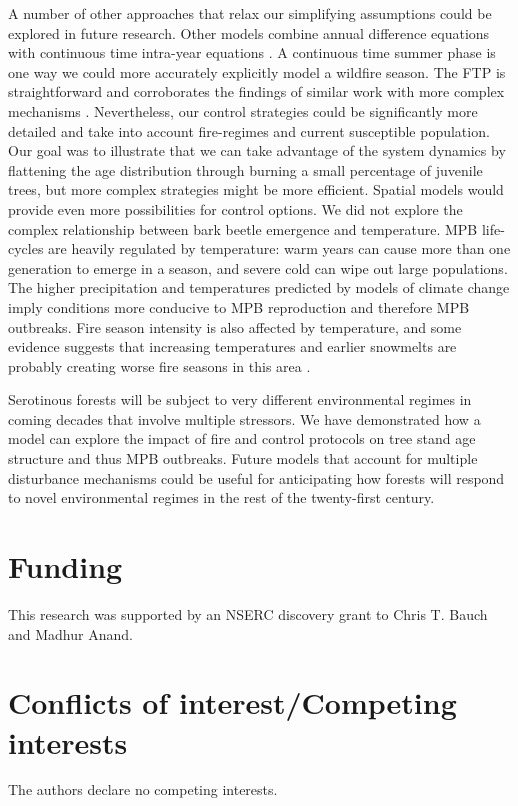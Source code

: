A number of other approaches that relax our simplifying assumptions could be explored in future research. Other models combine annual difference equations with continuous time intra-year equations \cite{strohm2016impacts,lynch2006influence,casagrandi1999minimal}. A continuous time summer phase is one way we could more accurately explicitly model a wildfire season. The FTP is straightforward and corroborates the findings of similar work with more complex mechanisms \cite{strohm2016impacts}. Nevertheless, our control strategies could be significantly more detailed and take into account fire-regimes and current susceptible population. Our goal was to illustrate that we can take advantage of the system dynamics by flattening the age distribution through burning a small percentage of juvenile trees, but more complex strategies might be more efficient. Spatial models would provide even more possibilities for control options. We did not explore the complex relationship between bark beetle emergence and temperature. MPB life-cycles are heavily regulated by temperature: warm years can cause more than one generation to emerge in a season, and severe cold can wipe out large populations. The higher precipitation and temperatures predicted by models of climate change imply conditions more conducive to MPB reproduction and therefore MPB outbreaks. Fire season intensity is also affected by temperature, and some evidence suggests that increasing temperatures and earlier snowmelts are probably creating worse fire seasons in this area \cite{westerling2006warming}. 

Serotinous forests will be subject to very different environmental regimes in coming decades that involve multiple stressors. We have demonstrated how a model can explore the impact of fire and control protocols on tree stand age structure and thus MPB outbreaks. Future models that account for multiple disturbance mechanisms could be useful for anticipating how forests will respond to novel environmental regimes in the rest of the twenty-first century. 


\section*{Funding}
This research was supported by an NSERC discovery grant to Chris T. Bauch and Madhur Anand.


\section*{Conflicts of interest/Competing interests}
The authors declare no competing interests.

